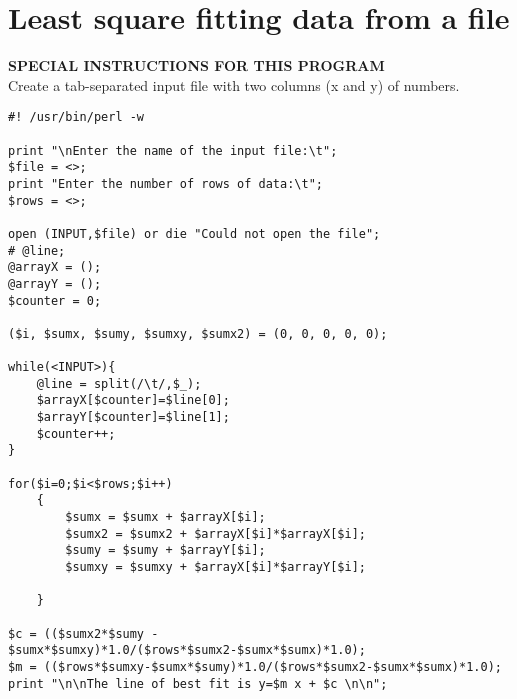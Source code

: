 \documentclass[11pt,oneside]{article}
\newcommand{\info}[1]{\textbf{\scriptsize{\sffamily\addfontfeatures{LetterSpace=7} #1\\[.35em]}}}
\begin{document}
\section{Least square fitting data from a file}
\begin{infobox}
\info{\MakeUppercase{Special instructions for this program}}
Create a tab-separated input file with two columns (x and y) of numbers.
\end{infobox}
\begin{lstlisting}
#! /usr/bin/perl -w

print "\nEnter the name of the input file:\t";
$file = <>;
print "Enter the number of rows of data:\t";
$rows = <>;

open (INPUT,$file) or die "Could not open the file";
# @line;
@arrayX = ();
@arrayY = ();
$counter = 0;

($i, $sumx, $sumy, $sumxy, $sumx2) = (0, 0, 0, 0, 0);

while(<INPUT>){
    @line = split(/\t/,$_);
    $arrayX[$counter]=$line[0];
    $arrayY[$counter]=$line[1];
    $counter++;
}

for($i=0;$i<$rows;$i++)
    {
        $sumx = $sumx + $arrayX[$i];
        $sumx2 = $sumx2 + $arrayX[$i]*$arrayX[$i];
        $sumy = $sumy + $arrayY[$i];
        $sumxy = $sumxy + $arrayX[$i]*$arrayY[$i];
        
    }
    
$c = (($sumx2*$sumy - $sumx*$sumxy)*1.0/($rows*$sumx2-$sumx*$sumx)*1.0);
$m = (($rows*$sumxy-$sumx*$sumy)*1.0/($rows*$sumx2-$sumx*$sumx)*1.0);
print "\n\nThe line of best fit is y=$m x + $c \n\n";
\end{lstlisting}
\end{document}
